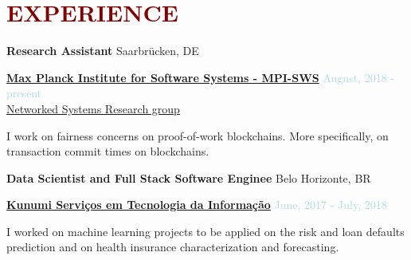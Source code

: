 

\section*{\textcolor{maroon}{\normalsize EXPERIENCE}}


\textbf{Research Assistant} \hfill {Saarbrücken, DE}
\begin{outerlist}

\item[] \href{https://www.mpi-sws.org}{\textbf{Max Planck Institute for Software Systems - MPI-SWS}}  \hfill {\textcolor{lightblue}{August, 2018 - present}}
\\ \href{https://www.mpi-sws.org/research-areas/social-and-information-systems/}{Networked Systems Research group}  \medskip 

        \begin{innerlist}[-]
        \item I work on fairness concerns on proof-of-work blockchains. More specifically, on transaction commit times on blockchains.     
        \end{innerlist}

\end{outerlist}

\medskip

\textbf{Data Scientist and Full Stack Software Enginee} \hfill {Belo Horizonte, BR}
\begin{outerlist}

\item[] \href{https://kunumi.com}{\textbf{Kunumi Serviços em Tecnologia da Informação}}  \hfill {\textcolor{lightblue}{June, 2017 - July, 2018}} \medskip 

        \begin{innerlist}[-]
        \item I worked on machine learning projects to be applied on the risk and loan defaults prediction and on health insurance characterization and forecasting.  
        \end{innerlist}

\end{outerlist}

\medskip




